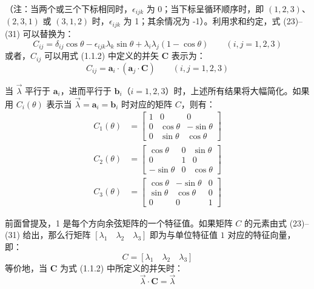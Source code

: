 （注：当两个或三个下标相同时，\(\epsilon_{ijk}\) 为 0；当下标呈循环顺序时，即 \((1,2,3)\)、\((2,3,1)\) 或 \((3,1,2)\) 时，\(\epsilon_{ijk}\) 为 1；其余情况为 -1）。利用求和约定，式 (23)--(31) 可以替换为：
\begin{equation}
C_{ij} = \delta_{ij} \cos\theta - \epsilon_{ijk}\lambda_k \sin\theta + \lambda_i\lambda_j(1-\cos\theta) \qquad (i, j = 1, 2, 3) \tag{33}
\end{equation}
或者，\(C_{ij}\) 可以用式 (1.1.2) 中定义的并矢 \(\mathbf{C}\) 表示为：
\begin{equation}
C_{ij} = \mathbf{a}_i \cdot (\mathbf{a}_j \cdot \mathbf{C}) \qquad (i, j = 1, 2, 3) \tag{34}
\end{equation}

当 \(\vec{\lambda}\) 平行于 \(\mathbf{a}_i\)，进而平行于 \(\mathbf{b}_i\)（\(i=1, 2, 3\)）时，上述所有结果将大幅简化。如果用 \(C_i(\theta)\) 表示当 \(\vec{\lambda} = \mathbf{a}_i = \mathbf{b}_i\) 时对应的矩阵 \(C\)，则有：
\begin{align}
C_1(\theta) &= \begin{bmatrix} 1 & 0 & 0 \\ 0 & \cos\theta & -\sin\theta \\ 0 & \sin\theta & \cos\theta \end{bmatrix} \tag{35} \\
C_2(\theta) &= \begin{bmatrix} \cos\theta & 0 & \sin\theta \\ 0 & 1 & 0 \\ -\sin\theta & 0 & \cos\theta \end{bmatrix} \tag{36} \\
C_3(\theta) &= \begin{bmatrix} \cos\theta & -\sin\theta & 0 \\ \sin\theta & \cos\theta & 0 \\ 0 & 0 & 1 \end{bmatrix} \tag{37}
\end{align}

前面曾提及，1 是每个方向余弦矩阵的一个特征值。如果矩阵 \(C\) 的元素由式 (23)--(31) 给出，那么行矩阵 \([\lambda_1 \quad \lambda_2 \quad \lambda_3]\) 即为与单位特征值 \(1\) 对应的特征向量，即：
\begin{equation}
[\lambda_1 \quad \lambda_2 \quad \lambda_3] C = [\lambda_1 \quad \lambda_2 \quad \lambda_3] \tag{38}
\end{equation}
等价地，当 \(\mathbf{C}\) 为式 (1.1.2) 中所定义的并矢时：
\begin{equation}
\vec{\lambda} \cdot \mathbf{C} = \vec{\lambda} \tag{39}
\end{equation}

